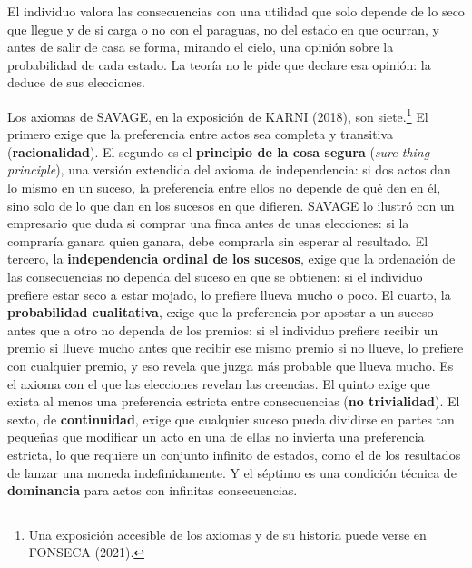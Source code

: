 \documentclass[10pt,a4paper]{article}
\begin{document}
El individuo valora las consecuencias con una utilidad que solo depende de lo seco que llegue y de si carga o no con el paraguas, no del estado en que ocurran, y antes de salir de casa se forma, mirando el cielo, una opinión sobre la probabilidad de cada estado. La teoría no le pide que declare esa opinión: la deduce de sus elecciones.

Los axiomas de SAVAGE, en la exposición de KARNI (2018), son siete.\footnote{%
    Una exposición accesible de los axiomas y de su historia puede verse en FONSECA (2021).
} El primero exige que la preferencia entre actos sea completa y transitiva (\textbf{racionalidad}). El segundo es el \textbf{principio de la cosa segura} (\textit{sure-thing principle}), una versión extendida del axioma de independencia: si dos actos dan lo mismo en un suceso, la preferencia entre ellos no depende de qué den en él, sino solo de lo que dan en los sucesos en que difieren. SAVAGE lo ilustró con un empresario que duda si comprar una finca antes de unas elecciones: si la compraría ganara quien ganara, debe comprarla sin esperar al resultado. El tercero, la \textbf{independencia ordinal de los sucesos}, exige que la ordenación de las consecuencias no dependa del suceso en que se obtienen: si el individuo prefiere estar seco a estar mojado, lo prefiere llueva mucho o poco. El cuarto, la \textbf{probabilidad cualitativa}, exige que la preferencia por apostar a un suceso antes que a otro no dependa de los premios: si el individuo prefiere recibir un premio si llueve mucho antes que recibir ese mismo premio si no llueve, lo prefiere con cualquier premio, y eso revela que juzga más probable que llueva mucho. Es el axioma con el que las elecciones revelan las creencias. El quinto exige que exista al menos una preferencia estricta entre consecuencias (\textbf{no trivialidad}). El sexto, de \textbf{continuidad}, exige que cualquier suceso pueda dividirse en partes tan pequeñas que modificar un acto en una de ellas no invierta una preferencia estricta, lo que requiere un conjunto infinito de estados, como el de los resultados de lanzar una moneda indefinidamente. Y el séptimo es una condición técnica de \textbf{dominancia} para actos con infinitas consecuencias.
\end{document}
